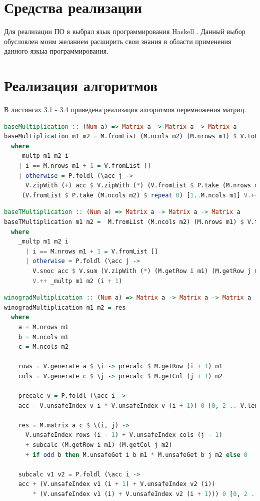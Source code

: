 \documentclass[12pt]{report}
\begin{document}
\section{Средства реализации}
Для реализации ПО я выбрал язык программирования Haskell \cite{Haskell}. Данный выбор обусловлен моим желанием расширить свои знания в области применения данного язкыа программирования. 

\section{Реализация алгоритмов}

В листингах 3.1 - 3.4 приведена реализация алгоритмов перемножения матриц.

\begin{lstlisting}[label=some-code,caption=Функция умножения матриц обычным способом, language=Haskell]
baseMultiplication :: (Num a) => Matrix a -> Matrix a -> Matrix a
baseMultiplication m1 m2 = M.fromList (M.ncols m2) (M.nrows m1) $ V.toList $ _multp m1 m2 1
  where
    _multp m1 m2 i
    | i == M.nrows m1 + 1 = V.fromList []
    | otherwise = P.foldl (\acc j ->
      V.zipWith (+) acc $ V.zipWith (*) (V.fromList $ P.take (M.nrows m1) $ repeat (M.getElem i j m1)) (M.getRow j m2))
     (V.fromList $ P.take (M.ncols m2) $ repeat 0) [1..M.ncols m1] V.++ _multp m1 m2 (i + 1)
\end{lstlisting}

\begin{lstlisting}[label=some-code,caption=Функция умножения матриц с транспонированием,language=Haskell]
baseTMultiplication :: (Num a) => Matrix a -> Matrix a -> Matrix a
baseTMultiplication m1 m2 =  M.fromList (M.ncols m2) (M.nrows m1) $ V.toList $ _multp m1 (M.transpose m2) 1
  where
    _multp m1 m2 i
      | i == M.nrows m1 + 1 = V.fromList []
      | otherwise = P.foldl (\acc j ->
        V.snoc acc $ V.sum (V.zipWith (*) (M.getRow i m1) (M.getRow j m2))) (V.fromList []) [1..M.nrows m2]
        V.++ _multp m1 m2 (i + 1)
\end{lstlisting}

\begin{lstlisting}[label=some-code,caption=Функция умножения матриц по Винограду,language=Haskell]
winogradMultiplication :: (Num a) => Matrix a -> Matrix a -> Matrix a
winogradMultiplication m1 m2 = res
  where
    a = M.nrows m1
    b = M.ncols m1
    c = M.ncols m2

    rows = V.generate a $ \i -> precalc $ M.getRow (i + 1) m1
    cols = V.generate c $ \j -> precalc $ M.getCol (j + 1) m2

    precalc v = P.foldl (\acc i ->
    acc - V.unsafeIndex v i * V.unsafeIndex v (i + 1)) 0 [0, 2 .. V.length v - 2]
	
    res = M.matrix a c $ \(i, j) ->
      V.unsafeIndex rows (i - 1) + V.unsafeIndex cols (j - 1)
      + subcalc (M.getRow i m1) (M.getCol j m2)
      + if odd b then M.unsafeGet i b m1 * M.unsafeGet b j m2 else 0
	
    subcalc v1 v2 = P.foldl (\acc i ->
    acc + (V.unsafeIndex v1 (i + 1) + V.unsafeIndex v2 (i))
        * (V.unsafeIndex v1 (i) + V.unsafeIndex v2 (i + 1))) 0 [0, 2 .. V.length v1 - 2]
\end{lstlisting}
\end{document}
